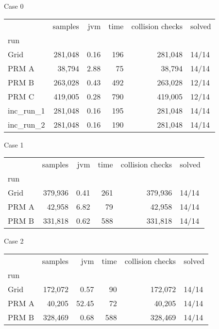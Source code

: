 Case 0
\begin{tabular}{lrrrrl}
\toprule
{} & samples &  jvm & time & collision checks & solved \\
run       &         &      &      &                  &        \\
\midrule
Grid      & 281,048 & 0.16 &  196 &          281,048 &  14/14 \\
PRM A     &  38,794 & 2.88 &   75 &           38,794 &  14/14 \\
PRM B     & 263,028 & 0.43 &  492 &          263,028 &  12/14 \\
PRM C     & 419,005 & 0.28 &  790 &          419,005 &  12/14 \\
inc\_run\_1 & 281,048 & 0.16 &  195 &          281,048 &  14/14 \\
inc\_run\_2 & 281,048 & 0.16 &  190 &          281,048 &  14/14 \\
\bottomrule
\end{tabular}


Case 1
\begin{tabular}{lrrrrl}
\toprule
{} & samples &  jvm & time & collision checks & solved \\
run   &         &      &      &                  &        \\
\midrule
Grid  & 379,936 & 0.41 &  261 &          379,936 &  14/14 \\
PRM A &  42,958 & 6.82 &   79 &           42,958 &  14/14 \\
PRM B & 331,818 & 0.62 &  588 &          331,818 &  14/14 \\
\bottomrule
\end{tabular}


Case 2
\begin{tabular}{lrrrrl}
\toprule
{} & samples &   jvm & time & collision checks & solved \\
run   &         &       &      &                  &        \\
\midrule
Grid  & 172,072 &  0.57 &   90 &          172,072 &  14/14 \\
PRM A &  40,205 & 52.45 &   72 &           40,205 &  14/14 \\
PRM B & 328,469 &  0.68 &  588 &          328,469 &  14/14 \\
\bottomrule
\end{tabular}


